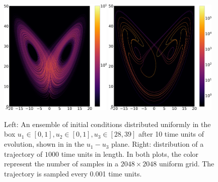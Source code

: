\begin{figure} \centering
\includegraphics[width=0.48\textwidth]{figure/lorenz_trajectory_1000.0.png}
\hspace{0.02\textwidth}
\includegraphics[width=0.48\textwidth]{figure/lorenz_ensemble_10.png}
\caption{
Left: An ensemble of initial conditions distributed uniformly in the box $u_1\in[0,1], u_2\in[0,1], u_3\in[28,39]$ 
after 10 time units of evolution, shown in in the $u_1-u_3$ plane.
Right: distribution of a trajectory of $1000$ time units in length.
In both plots, the color represent the number of samples in a
$2048\times2048$ uniform grid.  The trajectory is sampled every 0.001 time units.
}
\label{fig:lorenz_ergodicity1}
\end{figure}
